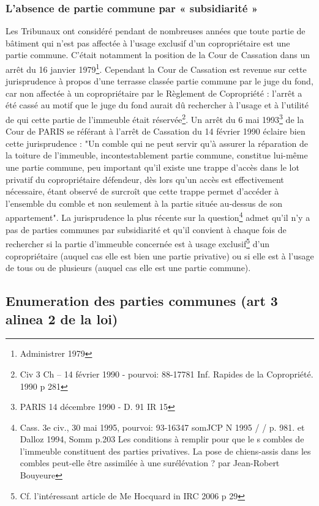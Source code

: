 		\subsubsection{L’absence de partie commune par « subsidiarité »}
		
			Les Tribunaux ont considéré pendant de nombreuses années que toute partie de bâtiment qui n'est pas
			affectée à l'usage exclusif d'un copropriétaire est une partie commune. C’était notamment la position de
			la Cour de Cassation dans un arrêt du 16 janvier 1979\footnote{Administrer 1979 }.
			Cependant la Cour de Cassation est revenue sur cette jurisprudence à propos d'une terrasse classée partie
			commune par le juge du fond, car non affectée à un copropriétaire par le Règlement de Copropriété :
			l’arrêt a été cassé au motif que le juge du fond aurait dû rechercher à l'usage et à l'utilité de qui cette
			partie de l'immeuble était réservée\footnote{Civ 3\degre{} Ch – 14 février 1990 - pourvoi: 88-17781 Inf. Rapides de la Copropriété. 1990 p 281}.
			Un arrêt du 6 mai 1993\footnote{PARIS 14 décembre 1990 - D. 91 IR 15} de la Cour de PARIS se référant à l'arrêt de Cassation du 14 février 1990 éclaire
			bien cette jurisprudence : "Un comble qui ne peut servir qu'à assurer la réparation de la toiture de
			l'immeuble, incontestablement partie commune, constitue lui-même une partie commune, peu important
			qu'il existe une trappe d'accès dans le lot privatif du copropriétaire défendeur, dès lors qu'un accès est
			effectivement nécessaire, étant observé de surcroît que cette trappe permet d'accéder à l'ensemble du
			comble et non seulement à la partie située au-dessus de son appartement".
			La jurisprudence la plus récente sur la question\footnote{Cass. 3e civ., 30 mai 1995, pourvoi: 93-16347 somJCP N 1995 /  / p. 981. et Dalloz 1994, Somm p.203 Les conditions à remplir pour que le s combles de l'immeuble constituent des parties privatives. La pose	de chiens-assis dans les combles peut-elle être assimilée à une surélévation ? par Jean-Robert Bouyeure} admet qu’il n’y a pas de parties communes par	subsidiarité et qu’il convient à chaque fois de rechercher si la partie d’immeuble concernée est à usage exclusif\footnote{Cf. l’intéressant article de Me Hocquard in IRC 2006  p 29} d’un copropriétaire (auquel cas elle est bien une partie privative) ou si elle est à l’usage de tous ou de plusieurs (auquel cas elle est une partie commune).
	
	\subsection{Enumeration des parties communes (art 3 alinea 2 de la loi)}
	
